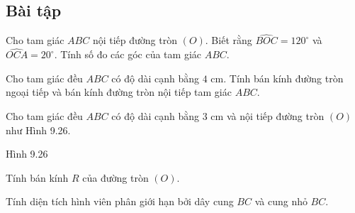 \begin{exercises}
    \subsection{Bài tập}

    \begin{questions}[resume=SGK]
        \item Cho tam giác $ABC$ nội tiếp đường tròn $(O)$. Biết rằng $\widehat{BOC}=120^\circ$ và $\widehat{OCA}=20^\circ$. Tính số đo các góc của tam giác $ABC$.

        \answerline
        \answerline
        \answerline

        \item Cho tam giác đều $ABC$ có độ dài cạnh bằng $4$ cm. Tính bán kính đường tròn ngoại tiếp và bán kính đường tròn nội tiếp tam giác $ABC$.

        \answerline
        \answerline
        \answerline

        \item Cho tam giác đều $ABC$ có độ dài cạnh bằng $3$ cm và nội tiếp đường tròn $(O)$ như Hình 9.26.

        \begin{center}

            Hình 9.26
        \end{center}

        \begin{questions}
            \item Tính bán kính $R$ của đường tròn $(O)$.

            \answerline
            \answerline
            \item Tính diện tích hình viên phân giới hạn bởi dây cung $BC$ và cung nhỏ $BC$.


\end{questions}
\end{questions}
\end{exercises}

